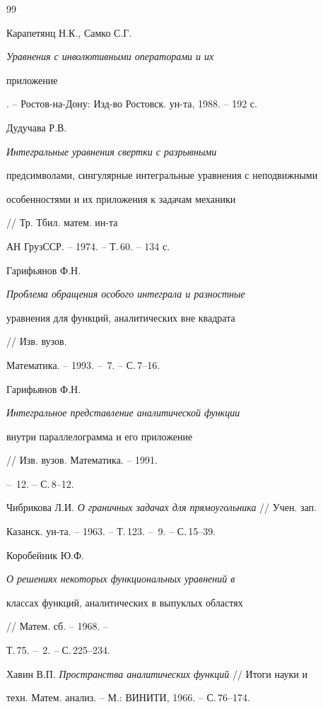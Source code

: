 \begin{thebibliography}{99} 


 




Карапетянц Н.К., Самко С.Г. {\em Уравнения с инволютивными операторами и их 


приложение}. -- Ростов-на-Дону: Изд-во Ростовск. ун-та, 1988. -- 192 с. 




Дудучава Р.В. {\em Интегральные уравнения свертки с разрывными 


предсимволами, сингулярные интегральные уравнения с неподвижными 


особенностями и их приложения к задачам механики} // Тр. Тбил. матем. ин-та 


АН ГрузССР. -- 1974. -- Т.\,60. -- 134 с. 




Гарифьянов Ф.Н. {\em Проблема обращения особого интеграла и разностные 


уравнения для функций, аналитических вне квадрата} // Изв. вузов. 


Математика. -- 1993. -- \No\,7. -- С.\,7--16. 




Гарифьянов Ф.Н. {\em Интегральное представление аналитической функции 


внутри параллелограмма и его приложение} // Изв. вузов. Математика. -- 1991. 


-- \No\,12. -- С.\,8--12. 




Чибрикова Л.И. {\em О граничных задачах для прямоугольника} // Учен. зап. 


Казанск. ун-та. -- 1963. -- Т.\,123. -- \No\,9. -- С.\,15--39. 




Коробейник Ю.Ф. {\em О решениях некоторых функциональных уравнений в 


классах функций, аналитических в выпуклых областях} // Матем. сб. -- 1968. -- 


Т.\,75. -- \No\,2. -- С.\,225--234. 




Хавин В.П. {\em Пространства аналитических функций} // Итоги науки и 


техн. Матем. анализ. -- М.: ВИНИТИ, 1966. -- С.\,76--174. 





\end{thebibliography}
